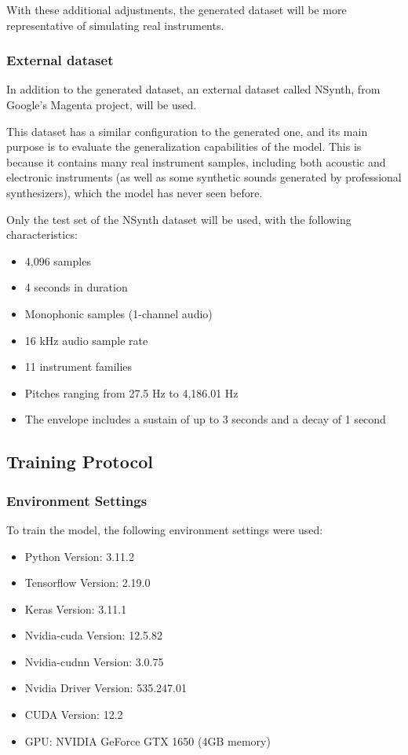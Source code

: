 \documentclass[sigconf,natbib=false]{acmart}
\begin{document}
With these additional adjustments, the generated dataset will be more representative of simulating real instruments.

\subsubsection{External dataset}

In addition to the generated dataset, an external dataset called NSynth, from Google's Magenta project, will be used.

This dataset has a similar configuration to the generated one, and its main purpose is to evaluate the generalization capabilities of the model. This is because it contains many real instrument samples, including both acoustic and electronic instruments (as well as some synthetic sounds generated by professional synthesizers), which the model has never seen before.

Only the test set of the NSynth dataset will be used, with the following characteristics:

\begin{itemize}
\item 4,096 samples
\item 4 seconds in duration
\item Monophonic samples (1-channel audio)
\item 16 kHz audio sample rate
\item 11 instrument families
\item Pitches ranging from 27.5 Hz to 4,186.01 Hz
\item The envelope includes a sustain of up to 3 seconds and a decay of 1 second
\end{itemize}

\subsection{Training Protocol}

\subsubsection{Environment Settings}

To train the model, the following environment settings were used:

\begin{itemize}
\item Python Version: 3.11.2
\item Tensorflow Version: 2.19.0
\item Keras Version: 3.11.1
\item Nvidia-cuda Version: 12.5.82
\item Nvidia-cudnn Version: 3.0.75
\item Nvidia Driver Version: 535.247.01
\item CUDA Version: 12.2
\item GPU: NVIDIA GeForce GTX 1650 (4GB memory)
\end{itemize}
\end{document}
